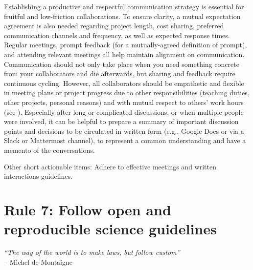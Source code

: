 \documentclass{article}
\begin{document}
Establishing a productive and respectful communication strategy is essential for fruitful and low-friction collaborations. To ensure clarity, a mutual expectation agreement is also needed regarding project length, cost sharing, preferred communication channels and frequency, as well as expected response times. Regular meetings, prompt feedback (for a mutually-agreed definition of prompt), and attending relevant meetings all help maintain alignment on communication. Communication should not only take place when you need something concrete from your collaborators and die afterwards, but sharing and feedback require continuous cycling. However, all collaborators should be empathetic and flexible in meeting plans or project progress due to other responsibilities (teaching duties, other projects, personal reasons) and with mutual respect to others’ work hours (see ). Especially after long or complicated discussions, or when multiple people were involved, it can be helpful to prepare a summary of important discussion points and decisions to be circulated in written form (e.g., Google Docs or via a Slack or Mattermost channel), to represent a common understanding and have a memento of the conversations.

Other short actionable items: Adhere to effective meetings\cite{leblanc2019planning} and written interactions guidelines\cite{gruber2020email}.

\section*{Rule 7: Follow open and reproducible science guidelines} %
\label{rule7_repro}

\begin{flushright}
\rightskip=1cm\textit{``The way of the world is to make laws, but follow custom''} \\
\vspace{.2em}
\rightskip=0cm -- Michel de Montaigne
\end{flushright}
\end{document}
